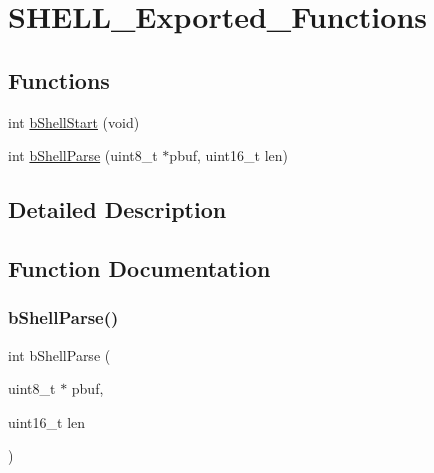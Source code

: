 \hypertarget{group___s_h_e_l_l___exported___functions}{}\section{S\+H\+E\+L\+L\+\_\+\+Exported\+\_\+\+Functions}
\label{group___s_h_e_l_l___exported___functions}
\subsection*{Functions}
\begin{DoxyCompactItemize}
\item 
int \mbox{\hyperlink{group___s_h_e_l_l___exported___functions_ga0f12cb556471a8fcdeb7b4bceb7cda0a}{b\+Shell\+Start}} (void)
\item 
int \mbox{\hyperlink{group___s_h_e_l_l___exported___functions_ga78d554e88a85a49891ec7b2688a1883a}{b\+Shell\+Parse}} (uint8\+\_\+t $\ast$pbuf, uint16\+\_\+t len)
\end{DoxyCompactItemize}


\subsection{Detailed Description}


\subsection{Function Documentation}
\mbox{\label{group___s_h_e_l_l___exported___functions_ga78d554e88a85a49891ec7b2688a1883a}} 
\subsubsection{\texorpdfstring{b\+Shell\+Parse()}{bShellParse()}}
{\footnotesize\ttfamily int b\+Shell\+Parse (\begin{DoxyParamCaption}\item[{uint8\+\_\+t $\ast$}]{pbuf,  }\item[{uint16\+\_\+t}]{len }\end{DoxyParamCaption})}


